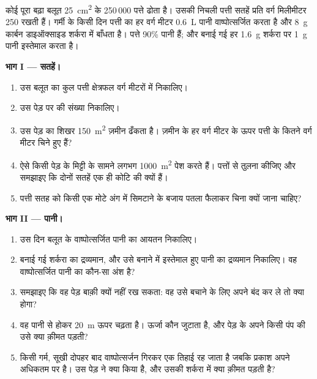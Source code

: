 \begin{problem}[{सप्ताहांत समस्या --- किसी पेड़ के लेन-देन का हिसाब: पत्ते
और रंध्र गिने गए, पानी उठाया गया और शर्करा बनाई गई, फ्लोएम की सप्लाई, और
बाहर भेजे गए बीज}]
\label{pb:g12:plant-rooted-life:1}
कोई पूरा बढ़ा बलूत \qty{25}{cm^2} के 250\,000 पत्ते ढोता है। उसकी निचली
पत्ती सतहें प्रति वर्ग मिलीमीटर 250  रखती हैं। गर्मी के किसी दिन पत्ती
का हर वर्ग मीटर \qty{0.6}{L} पानी वाष्पोत्सर्जित करता है और \qty{8}{g}
कार्बन डाइऑक्साइड शर्करा में बाँधता है। पत्ते 90\% पानी हैं; और
 बनाई गई हर \qty{1.6}{g} शर्करा पर \qty{1}{g} पानी इस्तेमाल
करता है।

\medskip
\noindent\textbf{भाग I --- सतहें।}
\begin{enumerate}
  \item उस बलूत का कुल पत्ती क्षेत्रफल वर्ग मीटरों में निकालिए।
  \item उस पेड़ पर  की संख्या निकालिए।
  \item उस पेड़ का शिखर \qty{150}{m^2} ज़मीन ढँकता है। ज़मीन के हर वर्ग
        मीटर के ऊपर पत्ती के कितने वर्ग मीटर चिने हुए हैं?
  \item ऐसे किसी पेड़ के  मिट्टी के सामने लगभग \qty{1000}{m^2} पेश
        करते हैं। पत्तों से तुलना कीजिए और समझाइए कि दोनों सतहें एक ही
        कोटि की क्यों हैं।
  \item पत्ती सतह को किसी एक मोटे अंग में सिमटाने के बजाय पतला फैलाकर चिना
        क्यों जाना चाहिए?
\end{enumerate}

\medskip
\noindent\textbf{भाग II --- पानी।}
\begin{enumerate}[resume]
  \item उस दिन बलूत के वाष्पोत्सर्जित पानी का आयतन निकालिए।
  \item बनाई गई शर्करा का द्रव्यमान, और उसे बनाने में इस्तेमाल हुए पानी का
        द्रव्यमान निकालिए। वह वाष्पोत्सर्जित पानी का कौन-सा अंश है?
  \item समझाइए कि वह पेड़ बाक़ी क्यों नहीं रख सकता: वह उसे बचाने के लिए
        अपने  बंद कर ले तो क्या होगा?
  \item वह पानी  से होकर \qty{20}{m} ऊपर चढ़ता है। ऊर्जा कौन जुटाता
        है, और पेड़ के अपने किसी पंप की उसे क्या क़ीमत पड़ती?
  \item किसी गर्म, सूखी दोपहर बाद वाष्पोत्सर्जन गिरकर एक तिहाई रह जाता है
        जबकि प्रकाश अपने अधिकतम पर है। उस पेड़ ने क्या किया है, और उसकी
        शर्करा में क्या क़ीमत पड़ती है?
\end{enumerate}


\end{problem}
